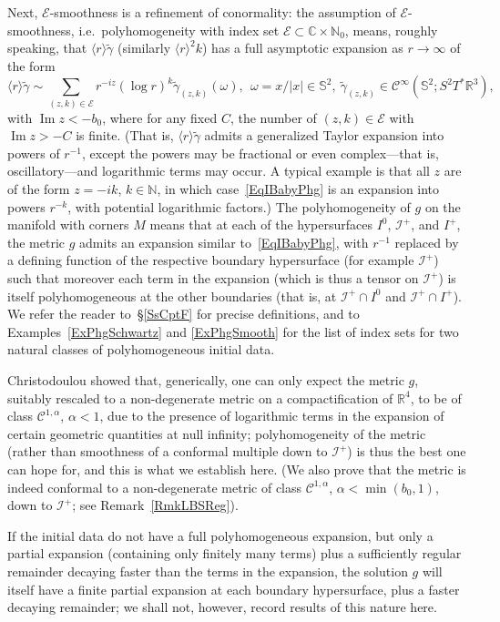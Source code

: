 \documentclass[reqno,11pt,letterpaper]{amsart}
\numberwithin{equation}{section}
\numberwithin{figure}{section}
\theoremstyle{definition}
\theoremstyle{remark}
\newcommand{\mc}{\mathcal}
\newcommand{\cC}{\mc C}
\newcommand{\cE}{\mc E}
\newcommand{\ms}{\mathscr}
\newcommand{\scri}{\ms I}
\newcommand{\C}{\mathbb{C}}
\newcommand{\N}{\mathbb{N}}
\newcommand{\R}{\mathbb{R}}
\newcommand{\Sph}{\mathbb{S}}
\renewcommand{\Im}{\operatorname{Im}}
\newcommand{\la}{\langle}
\newcommand{\ra}{\rangle}
\newcommand{\wt}{\widetilde}
\newcommand{\CI}{\cC^\infty}
\begin{document}
Next, $\cE$-smoothness is a refinement of conormality: the assumption of $\cE$-smoothness, i.e.\ polyhomogeneity with index set $\cE\subset\C\times\N_0$, means, roughly speaking, that $\la r\ra\wt\gamma$ (similarly $\la r\ra^2 k$) has a full asymptotic expansion as $r\to\infty$ of the form
\begin{equation}
\label{EqIBabyPhg}
  \la r\ra\wt\gamma \sim \sum_{(z,k)\in\cE} r^{-i z}(\log r)^k\wt\gamma_{(z,k)}(\omega),\ \ \omega=x/|x|\in\Sph^2,\ \wt\gamma_{(z,k)}\in\CI(\Sph^2;S^2 T^*\R^3),
\end{equation}
with $\Im z<-b_0$, where for any fixed $C$, the number of $(z,k)\in\cE$ with $\Im z>-C$ is finite. (That is, $\la r\ra\wt\gamma$ admits a generalized Taylor expansion into powers of $r^{-1}$, except the powers may be fractional or even complex---that is, oscillatory---and logarithmic terms may occur. A typical example is that all $z$ are of the form $z=-i k$, $k\in\N$, in which case~\eqref{EqIBabyPhg} is an expansion into powers $r^{-k}$, with potential logarithmic factors.) The polyhomogeneity of $g$ on the manifold with corners $M$ means that at each of the hypersurfaces $I^0$, $\scri^+$, and $I^+$, the metric $g$ admits an expansion similar to~\eqref{EqIBabyPhg}, with $r^{-1}$ replaced by a defining function of the respective boundary hypersurface (for example $\scri^+$) such that moreover each term in the expansion (which is thus a tensor on $\scri^+$) is itself polyhomogeneous at the other boundaries (that is, at $\scri^+\cap I^0$ and $\scri^+\cap I^+$). We refer the reader to~\S\ref{SsCptF} for precise definitions, and to Examples~\ref{ExPhgSchwartz} and \ref{ExPhgSmooth} for the list of index sets for two natural classes of polyhomogeneous initial data.

Christodoulou \cite{ChristodoulouNoPeeling} showed that, generically, one can only expect the metric $g$, suitably rescaled to a non-degenerate metric on a compactification of $\R^4$, to be of class $\cC^{1,\alpha}$, $\alpha<1$, due to the presence of logarithmic terms in the expansion of certain geometric quantities at null infinity; polyhomogeneity of the metric (rather than smoothness of a conformal multiple down to $\scri^+$) is thus the best one can hope for, and this is what we establish here. (We also prove that the metric is indeed conformal to a non-degenerate metric of class $\cC^{1,\alpha}$, $\alpha<\min(b_0,1)$, down to $\scri^+$; see Remark~\ref{RmkLBSReg}).

If the initial data do not have a full polyhomogeneous expansion, but only a partial expansion (containing only finitely many terms) plus a sufficiently regular remainder decaying faster than the terms in the expansion, the solution $g$ will itself have a finite partial expansion at each boundary hypersurface, plus a faster decaying remainder; we shall not, however, record results of this nature here.
\end{document}
